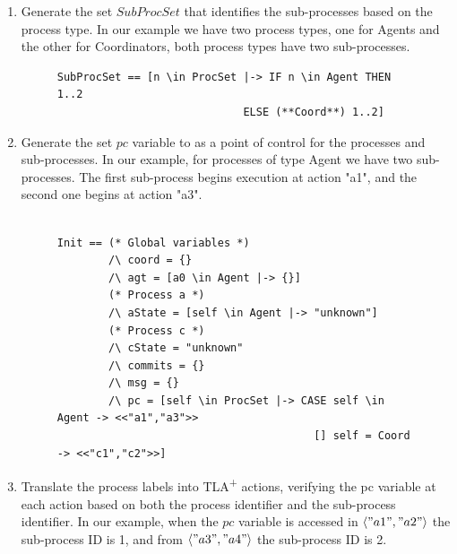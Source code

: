 \documentclass{thesul}
\newcommand{\tlaplus}{TLA\textsuperscript{+}\xspace}
\newcommand{\seq}[1]{\langle #1 \rangle}
\begin{document}
\begin{enumerate}

\item Generate the set $SubProcSet$ that identifies the sub-processes based on the process type.
In our example we have two process types, one for Agents and the other for Coordinators, both process types have two sub-processes.

\FloatBarrier
\begin{figure}[!h]
\label{2pcSubTla}
\begin{lstlisting}[caption = Distributed PlusCal Translation- SubProcSet, frame = tlrb, firstnumber = 1]
SubProcSet == [n \in ProcSet |-> IF n \in Agent THEN 1..2
                             ELSE (**Coord**) 1..2]

\end{lstlisting}
\end{figure}
\FloatBarrier

\item Generate the set $pc$ variable to as a point of control for the processes and sub-processes.
In our example, for processes of type Agent we have two sub-processes. The first sub-process begins execution at action "a1", and the second one begins at action "a3".
\hfill\\

\FloatBarrier
\begin{figure}[!h]
\begin{lstlisting}[caption = TLA+ translation for Sub-Processes, frame = tlrb, firstnumber = 1]

Init == (* Global variables *)
        /\ coord = {}
        /\ agt = [a0 \in Agent |-> {}]
        (* Process a *)
        /\ aState = [self \in Agent |-> "unknown"]
        (* Process c *)
        /\ cState = "unknown"
        /\ commits = {}
        /\ msg = {}
        /\ pc = [self \in ProcSet |-> CASE self \in Agent -> <<"a1","a3">>
                                        [] self = Coord -> <<"c1","c2">>]
\end{lstlisting}
\end{figure}
\FloatBarrier

\item Translate the process labels into \tlaplus actions, verifying the pc variable at each action based on both the process identifier and the sub-process identifier.
In our example, when the $pc$ variable is accessed in $\seq{"a1", "a2"}$ the sub-process ID is 1, and from $\seq{"a3", "a4"}$ the sub-process ID is 2.

\FloatBarrier
\begin{figure}
\begin{lstlisting}[caption = TLA+ translation for Sub-Processes, frame = tlrb, firstnumber = 1]


\end{lstlisting}
\end{figure}
\end{enumerate}
\end{document}
